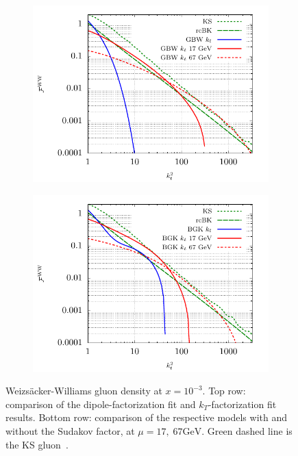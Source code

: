 \documentclass[11pt]{article}
\numberwithin{equation}{section}
\numberwithin{table}{section}
\numberwithin{figure}{section}
\begin{document}
\begin{figure}[t]
\begin{subfigure}{0.5\textwidth}
        \includegraphics[width=\textwidth]{plots/GBWWW2} 
    \end{subfigure}
    \begin{subfigure}{0.5\textwidth}
        \includegraphics[width=\textwidth]{plots/BGKWW2} 
    \end{subfigure}
    \caption{\footnotesize Weizs\"acker-Williams gluon density at $x=10^{-3}$. Top row: comparison of the dipole-factorization fit and $k_T$-factorization fit results. Bottom row: comparison of the respective models with and without the Sudakov factor, at $\mu=17,\;67 \mathrm{GeV}$. Green dashed line is the KS gluon~\cite{vanHameren:2021sqc}. }
    \label{fig:ww}
\end{figure}
\end{document}
